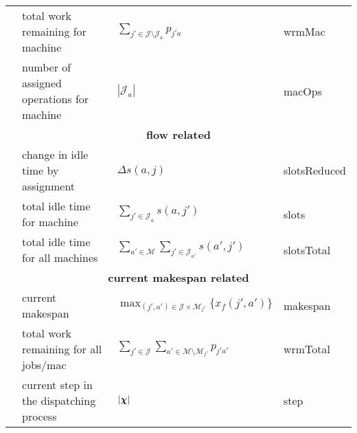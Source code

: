 \begin{tabular}{clll}
	\phiwrmMac       & total work remaining for machine          & $\sum_{j'\in\mathcal{J}\setminus \mathcal{J}_{a}}p_{j'a} $                         & wrmMac       \\
	\phimacOps       & number of assigned operations for machine & $|\mathcal{J}_a|$                                                                  & macOps       \\
	\midrule
	\multicolumn{4}{c}{\textbf{flow related}}\\
	\phislotsReduced & change in idle time by assignment         & $\Delta s(a,j)$                                                                    & slotsReduced \\
	\phislots        & total idle time for machine               & $\sum_{j'\in \mathcal{J}_a}s(a,j')$                                                & slots        \\
	\phislotsTotal   & total idle time for all machines          & $\sum_{a'\in \mathcal{M}}\sum_{j'\in \mathcal{J}_{a'}}s(a',j')$                    & slotsTotal   \\
	\midrule
	\multicolumn{4}{c}{\textbf{current makespan related}}\\
	\phimakespan     & current makespan                          & $\max_{(j',a')\in \mathcal{J} \times \mathcal{M}_{j'}}\{x_f(j',a')\}$              & makespan     \\
	\phiwrmTotal     & total work remaining for all jobs/mac     & $\sum_{j'\in\mathcal{J}}\sum_{a'\in\mathcal{M}\setminus \mathcal{M}_{j'}}p_{j'a'}$ & wrmTotal     \\
	\phistep         & current step in the dispatching process   & $|\bm \chi|$                                                                          & step         \\
	\bottomrule
\end{tabular}

